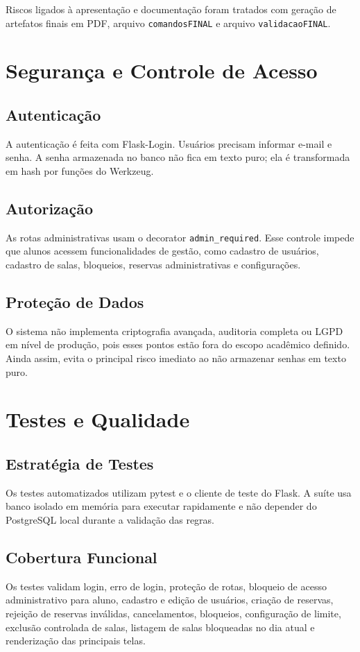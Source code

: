 \documentclass[12pt,a4paper]{article}
\begin{document}
Riscos ligados à apresentação e documentação foram tratados com geração de artefatos finais em PDF, arquivo \texttt{comandosFINAL} e arquivo \texttt{validacaoFINAL}.

\section{Segurança e Controle de Acesso}

\subsection{Autenticação}
A autenticação é feita com Flask-Login. Usuários precisam informar e-mail e senha. A senha armazenada no banco não fica em texto puro; ela é transformada em hash por funções do Werkzeug.

\subsection{Autorização}
As rotas administrativas usam o decorator \texttt{admin\_required}. Esse controle impede que alunos acessem funcionalidades de gestão, como cadastro de usuários, cadastro de salas, bloqueios, reservas administrativas e configurações.

\subsection{Proteção de Dados}
O sistema não implementa criptografia avançada, auditoria completa ou LGPD em nível de produção, pois esses pontos estão fora do escopo acadêmico definido. Ainda assim, evita o principal risco imediato ao não armazenar senhas em texto puro.

\section{Testes e Qualidade}

\subsection{Estratégia de Testes}
Os testes automatizados utilizam pytest e o cliente de teste do Flask. A suíte usa banco isolado em memória para executar rapidamente e não depender do PostgreSQL local durante a validação das regras.

\subsection{Cobertura Funcional}
Os testes validam login, erro de login, proteção de rotas, bloqueio de acesso administrativo para aluno, cadastro e edição de usuários, criação de reservas, rejeição de reservas inválidas, cancelamentos, bloqueios, configuração de limite, exclusão controlada de salas, listagem de salas bloqueadas no dia atual e renderização das principais telas.
\end{document}
